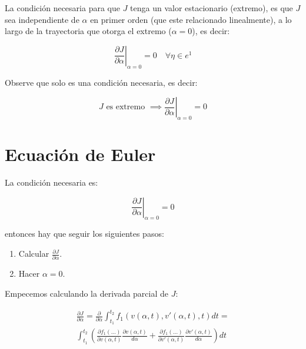     La condición necesaria para que $J$ tenga un valor estacionario (extremo), es que $J$ sea independiente de $\alpha$ en primer orden (que este relacionado linealmente), a lo largo de la trayectoria que otorga el extremo ($\alpha = 0$), es decir:

    \begin{equation}
        \left. \frac{\partial J}{\partial \alpha} \right|_{\alpha=0} = 0 \quad \forall \eta \in e^1
    \end{equation}

    \begin{nota}
        Observe que solo es una condición necesaria, es decir:

        \begin{equation*}
            J \text{ es extremo } \implies \left. \frac{\partial J}{\partial \alpha} \right|_{\alpha=0} = 0
        \end{equation*}
    \end{nota}

    \newpage
    \section{Ecuación de Euler}

    La condición necesaria es:

    \begin{equation*}
        \left. \frac{\partial J}{\partial \alpha} \right|_{\alpha=0} = 0
    \end{equation*}

    entonces hay que seguir los siguientes pasos:

    \begin{enumerate}
        \item Calcular $\frac{\partial J}{\partial \alpha}$.
        \item Hacer $\alpha = 0$.
    \end{enumerate}

    Empecemos calculando la derivada parcial de $J$:

    \begin{multline*}
        \frac{\partial J}{\partial \alpha} = \frac{\partial}{\partial \alpha} \int_{t_1}^{t_2} f_1(v(\alpha, t), v'(\alpha, t), t)dt = \\
        \int_{t_1}^{t_2}\left( \frac{\partial f_1(\dots)}{\partial v(\alpha, t)} \frac{\partial v(\alpha, t)}{d \alpha} + \frac{\partial f_1(\dots)}{\partial v'(\alpha, t)} \frac{\partial v'(\alpha, t)}{d \alpha} \right) dt
    \end{multline*}

